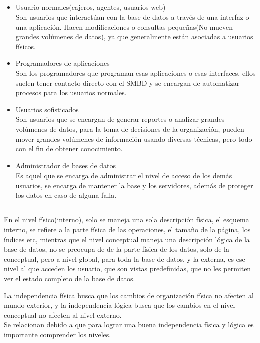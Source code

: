 \documentclass{article}
\begin{document}
\subsection{}
\begin{itemize}
    \item Usuario normales(cajeros, agentes, usuarios web)\\
    Son usuarios que interactúan con la base de datos a través de una interfaz o una aplicación. Hacen modificaciones o consultas pequeñas(No mueven grandes volúmenes de datos),
    ya que generalmente están asociadas a usuarios físicos.
    \item Programadores de aplicaciones\\
    Son los programadores que programan esas aplicaciones o esas interfaces, ellos suelen tener contacto directo con el SMBD y se encargan de automatizar procesos para los usuarios normales.
    
    \item Usuarios sofisticados\\
    Son usuarios que se encargan de generar reportes o analizar grandes volúmenes de datos, para la toma de decisiones de la organización,
    pueden mover grandes volúmenes de información usando diversas técnicas, pero todo con el fin de obtener conocimiento. 
    \item Administrador de bases de datos\\
    Es aquel que se encarga de administrar el nivel de acceso de los demás usuarios, se encarga de mantener la base y los servidores, además de proteger los datos en caso de alguna falla.
\end{itemize}
\subsection{}
En el nivel físico(interno), solo se maneja una sola descripción física, el esquema interno, se refiere a la parte física de las operaciones, el tamaño de la página, los índices etc, mientras que el nivel conceptual maneja una descripción lógica de la base de datos, no se preocupa de de la parte física de los datos, solo de la conceptual, pero a nivel global, para toda la base de datos, y la externa, es ese nivel al que acceden los usuario, que son vistas predefinidas, que no les permiten ver el estado completo de la base de datos.
\\\par
La independencia física busca que los cambios de organización física no afecten al mundo exterior, y la independencia lógica busca que los cambios en el nivel conceptual no afecten al nivel externo.\\
Se relacionan debido a que para lograr una buena independencia física y lógica es importante comprender los niveles.
\end{document}
